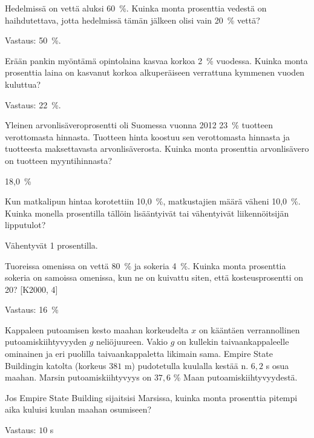 \begin{tehtava}
	Hedelmissä on vettä aluksi 60~\%. Kuinka monta prosenttia vedestä on 
	haihdutettava, jotta hedelmissä tämän jälkeen olisi vain 20~\% vettä?
	\begin{vastaus}
		Vastaus: 50~\%.
	\end{vastaus}
\end{tehtava}

\begin{tehtava}
    Erään pankin myöntämä opintolaina kasvaa korkoa 2~\% vuodessa. Kuinka monta 
    prosenttia laina on kasvanut korkoa alkuperäiseen verrattuna kymmenen vuoden kuluttua?
    \begin{vastaus}
        Vastaus: 22~\%.
    \end{vastaus}
\end{tehtava}

\begin{tehtava}
	Yleinen arvonlisäveroprosentti oli Suomessa vuonna 2012 23~\% tuotteen verottomasta 
	hinnasta. Tuotteen hinta koostuu sen verottomasta hinnasta 
	ja tuotteesta maksettavasta arvonlisäverosta. Kuinka monta 
	prosenttia arvonlisävero on tuotteen myyntihinnasta?
	\begin{vastaus}
		18,0~\%
	\end{vastaus}
\end{tehtava}

\begin{tehtava}
	Kun matkalipun hintaa korotettiin 10,0~\%, matkustajien määrä väheni 10,0~\%. 
	Kuinka monella prosentilla tällöin lisääntyivät tai vähentyivät liikennöitsijän 
	lipputulot?
	\begin{vastaus}
		Vähentyvät 1 prosentilla.
	\end{vastaus}
\end{tehtava}

\begin{tehtava}
    Tuoreissa omenissa on vettä 80~\% ja sokeria 4~\%. Kuinka monta prosenttia sokeria on samoissa omenissa, kun ne on kuivattu siten, että kosteusprosentti on 20? [K2000, 4]
    \begin{vastaus}
        Vastaus: 16~\%
    \end{vastaus}
\end{tehtava}

\begin{tehtava}
    Kappaleen putoamisen kesto maahan korkeudelta $x$ on kääntäen verrannollinen putoamiskiihtyvyyden $g$ neliöjuureen. Vakio $g$ on kullekin taivaankappaleelle ominainen ja eri puolilla taivaankappaletta likimain sama. Empire State Buildingin katolta (korkeus $381$ m) pudotetulla kuulalla kestää n. $6,2$ s osua maahan. Marsin putoamiskiihtyvyys on $37,6$ \% Maan putoamiskiihtyvyydestä. 
    
    Jos Empire State Building sijaitsisi Marsissa, kuinka monta prosenttia pitempi aika kuluisi kuulan maahan osumiseen?
    \begin{vastaus}
        Vastaus: $10$ s
    \end{vastaus}
\end{tehtava}

